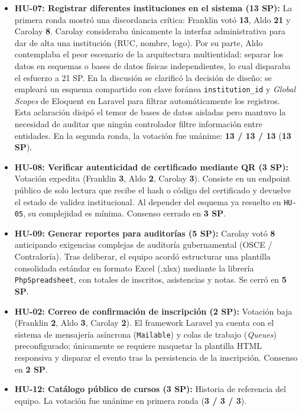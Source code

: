 \begin{itemize}
    \item \textbf{HU-07: Registrar diferentes instituciones en el sistema (13 SP):} La primera ronda mostró una discordancia crítica: Franklin votó \textbf{13}, Aldo \textbf{21} y Carolay \textbf{8}. Carolay consideraba únicamente la interfaz administrativa para dar de alta una institución (RUC, nombre, logo). Por su parte, Aldo contemplaba el peor escenario de la arquitectura multientidad: separar los datos en esquemas o bases de datos físicas independientes, lo cual disparaba el esfuerzo a 21 SP. En la discusión se clarificó la decisión de diseño: se empleará un esquema compartido con clave foránea \texttt{institution\_id} y \textit{Global Scopes} de Eloquent en Laravel para filtrar automáticamente los registros. Esta aclaración disipó el temor de bases de datos aisladas pero mantuvo la necesidad de auditar que ningún controlador filtre información entre entidades. En la segunda ronda, la votación fue unánime: \textbf{13 / 13 / 13} (\textbf{13 SP}).
    
    \item \textbf{HU-08: Verificar autenticidad de certificado mediante QR (3 SP):} Votación expedita (Franklin \textbf{3}, Aldo \textbf{2}, Carolay \textbf{3}). Consiste en un endpoint público de solo lectura que recibe el hash o código del certificado y devuelve el estado de validez institucional. Al depender del esquema ya resuelto en \texttt{HU-05}, su complejidad es mínima. Consenso cerrado en \textbf{3 SP}.
    
    \item \textbf{HU-09: Generar reportes para auditorías (5 SP):} Carolay votó \textbf{8} anticipando exigencias complejas de auditoría gubernamental (OSCE / Contraloría). Tras deliberar, el equipo acordó estructurar una plantilla consolidada estándar en formato Excel (.xlsx) mediante la librería \texttt{PhpSpreadsheet}, con totales de inscritos, asistencias y notas. Se cerró en \textbf{5 SP}.
    
    \item \textbf{HU-02: Correo de confirmación de inscripción (2 SP):} Votación baja (Franklin \textbf{2}, Aldo \textbf{3}, Carolay \textbf{2}). El framework Laravel ya cuenta con el sistema de mensajería asíncrona (\texttt{Mailable}) y colas de trabajo (\textit{Queues}) preconfigurado; únicamente se requiere maquetar la plantilla HTML responsiva y disparar el evento tras la persistencia de la inscripción. Consenso en \textbf{2 SP}.
    
    \item \textbf{HU-12: Catálogo público de cursos (3 SP):} Historia de referencia del equipo. La votación fue unánime en primera ronda (\textbf{3 / 3 / 3}).
    

\end{itemize}
